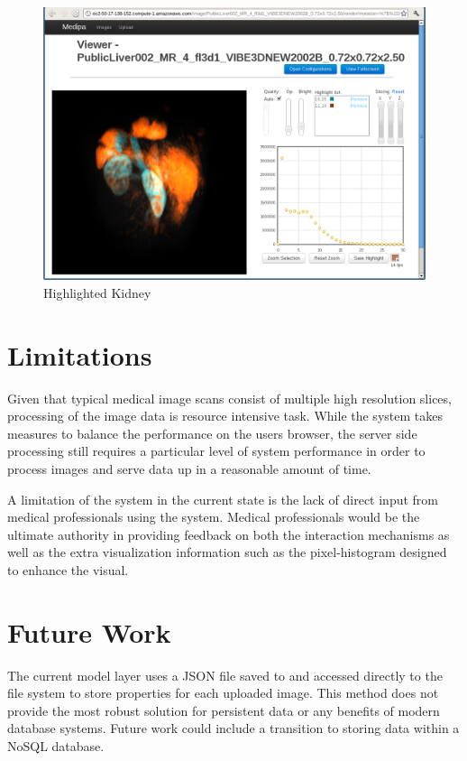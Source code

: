 \documentclass[annual]{acmsiggraph}
\begin{document}
\begin{figure}[htb]
\includegraphics[scale=0.475]{kidneys.png}
	\caption{\label{fig:head}Highlighted Kidney}
\end{figure}

\section{Limitations}
Given that typical medical image scans consist of multiple high resolution slices, processing of the image data is resource intensive task.  While the system takes measures to balance the performance on the users browser, the server side processing still requires a particular level of system performance in order to process images and serve data up in a reasonable amount of time.

A limitation of the system in the current state is the lack of direct input from medical professionals using the system.  Medical professionals would be the ultimate authority in providing feedback on both the interaction mechanisms as well as the extra visualization information such as the pixel-histogram designed to enhance the visual.

\section{Future Work} 
The current model layer uses a JSON file saved to and accessed directly to the file system to store properties for each uploaded image.  This method does not provide the most robust solution for persistent data or any benefits of modern database systems.  Future work could include a transition to storing data within a NoSQL database.
\end{document}

